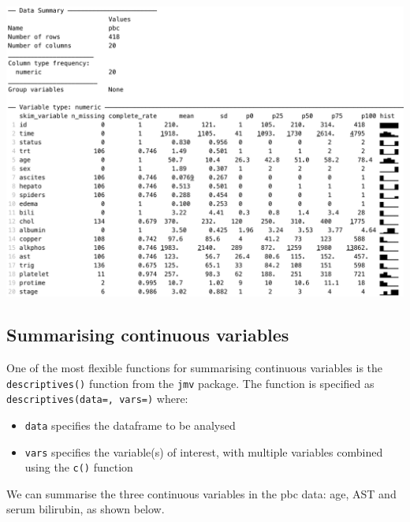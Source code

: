 \documentclass[
]{memoir}
\providecommand{\tightlist}{%
  \setlength{\itemsep}{0pt}\setlength{\parskip}{0pt}}
\begin{document}
\includegraphics[width=0.9\linewidth]{img/skim-pbc}

\hypertarget{summarising-continuous-variables}{%
\subsection{Summarising continuous variables}\label{summarising-continuous-variables}}

One of the most flexible functions for summarising continuous variables is the \texttt{descriptives()} function from the \texttt{jmv} package. The function is specified as \texttt{descriptives(data=,\ vars=)} where:

\begin{itemize}
\tightlist
\item
  \texttt{data} specifies the dataframe to be analysed
\item
  \texttt{vars} specifies the variable(s) of interest, with multiple variables combined using the \texttt{c()} function
\end{itemize}

We can summarise the three continuous variables in the pbc data: age, AST and serum bilirubin, as shown below.
\end{document}
